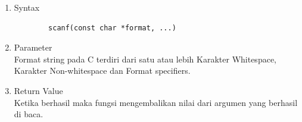 \begin{enumerate}
	\item Syntax
	      \begin{verbatim}
		scanf(const char *format, ...)
	\end{verbatim}
	\item Parameter \\
	      Format string pada C terdiri dari satu atau lebih Karakter Whitespace, Karakter Non-whitespace dan Format specifiers.
	\item Return Value \\
	      Ketika berhasil maka fungsi mengembalikan nilai dari argumen yang berhasil di baca.

\end{enumerate}

